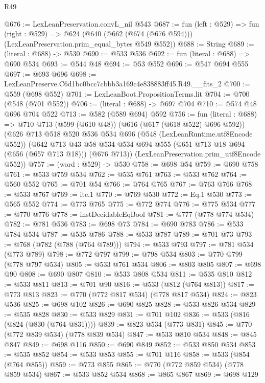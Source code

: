 \begin{lexlean}{R49}
\begin{coremodule}
@676 := LexLeanPreservation.convL_nil @543
@687 := fun (left : @529) =>
  fun (right : @529) =>
  @624 (@640 (@662 (@674 (@676 @594))) (LexLeanPreservation.prim_equal_bytes @549 @552))
@688 := String
@689 := (literal : @688) -> @530
@690 := @533 @536
@692 := fun (literal : @688) => @690 @534
@693 := @544 @48
@694 := @53 @552
@696 := @547 @694 @555
@697 := @693 @696
@698 := LexLeanPreserve.C6d1bc0bcc7cbbb3a169c4e838883ff45.R49.__fits_2
@700 := @559 (@698 @552)
@701 := LexLeanBoot.PropositionTerms.lit
@704 := @700 (@548 (@701 @552))
@706 := (literal : @688) -> @697 @704
@710 := @574 @48 @696 @704 @522
@713 := @582 (@589 @694) @592
@756 := fun (literal : @688) =>
  @710
    @713
    (@599 (@610 @48))
    (@616 (@617 (@618 @522) @696 @592))
    (@626
      @713
      @518
      @520
      @536
      @534
      @696
      (@548 (LexLeanRuntime.utf8Encode @552))
      (@642
        @713
        @43
        @58
        @534
        @534
        @694
        @555
        (@651 @713 @18 @694 (@656 (@657 @713 @18)))
        (@676 @713))
      (LexLeanPreservation.prim_utf8Encode @552))
@757 := (word : @529) -> @530
@758 := @698 @54
@759 := @690 @758
@761 := @533 @759 @534
@762 := @535 @761
@763 := @533 @762
@764 := @560 @552
@765 := @701 @54
@766 := @764 @765
@767 := @763 @766
@768 := @533 @767
@769 := ite.{1}
@770 := @769 @530
@772 := Eq.{1} @530
@773 := @565 @552
@774 := @773 @765
@775 := @772 @774
@776 := @775 @534
@777 := @770 @776
@778 := instDecidableEqBool
@781 := @777 (@778 @774 @534)
@782 := @781 @536
@783 := @698 @73
@784 := @690 @783
@786 := @533 @784 @534
@787 := @535 @786
@788 := @533 @787
@789 := @701 @73
@793 := @768 (@782 (@788 (@764 @789)))
@794 := @533 @793
@797 := @781 @534 (@773 @789)
@798 := @772 @797
@799 := @798 @534
@803 := @770 @799 (@778 @797 @534)
@805 := @533 @761 @534
@806 := @803 @805
@807 := @698 @90
@808 := @690 @807
@810 := @533 @808 @534
@811 := @535 @810
@812 := @533 @811
@813 := @701 @90
@816 := @533 (@812 (@764 @813))
@817 := @773 @813
@823 := @770 (@772 @817 @534) (@778 @817 @534)
@824 := @823 @536
@825 := @698 @102
@826 := @690 @825
@828 := @533 @826 @534
@829 := @535 @828
@830 := @533 @829
@831 := @701 @102
@836 := @533 (@816 (@824 (@830 (@764 @831))))
@839 := @823 @534 (@773 @831)
@845 := @770 (@772 @839 @534) (@778 @839 @534)
@847 := @533 @810 @534
@848 := @845 @847
@849 := @698 @116
@850 := @690 @849
@852 := @533 @850 @534
@853 := @535 @852
@854 := @533 @853
@855 := @701 @116
@858 := @533 (@854 (@764 @855))
@859 := @773 @855
@865 := @770 (@772 @859 @534) (@778 @859 @534)
@867 := @533 @852 @534
@868 := @865 @867
@869 := @698 @129

\end{coremodule}
\end{lexlean}
